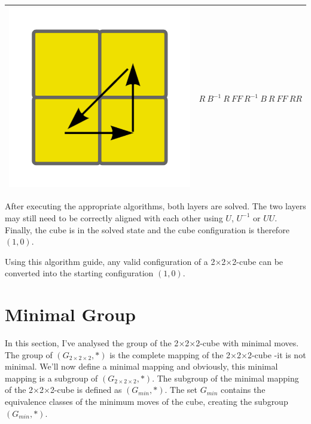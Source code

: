 \documentclass[12pt,a4paper]{article}
\theoremstyle{custom}
\newcommand{\Gtwo}{\ensuremath{G_{2\times 2\times 2}}}
\newcommand{\Ttwo}{2$\times$2$\times$2-}
\begin{document}
\begin{center}
\begin{tabular}{m{4cm} m{8cm}}
\includegraphics[scale=0.1]{corners3.png} & $R \ B^{-1} \ R \ FF \ R^{-1} \ B \ R \ FF \ RR $ \\

\bottomrule
\end{tabular}
\end{center}



After executing the appropriate algorithms, both layers are solved. The two layers may still need to be correctly aligned with each other using $U$, $U^{-1}$ or $UU$. Finally, the cube is in the solved state and the cube configuration is therefore $(1,0)$.

Using this algorithm guide, any valid configuration of a \Ttwo cube can be converted into the starting configuration $(1,0)$.
\section{Minimal Group}
\label{Chapter_MinSubgroup}

In this section, I've analysed the group of the \Ttwo cube   with minimal moves. The group of $\left(\Gtwo, \scriptstyle*\right)$ is the complete mapping of the \Ttwo cube -it is not minimal. We'll now define a minimal mapping and obviously, this minimal mapping is a subgroup of $\left(\Gtwo, \scriptstyle*\right)$.
The subgroup of the minimal mapping of the \Ttwo cube is defined as $\left(G_{min}, \scriptstyle*\right)$. The set $G_{min}$ contains the equivalence classes of the minimum moves of the cube, creating the subgroup  $\left(G_{min}, \scriptstyle*\right)$.
\end{document}
